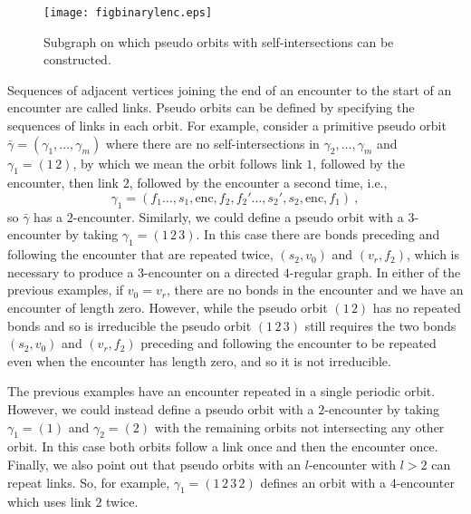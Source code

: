 \documentclass[doublecol]{epl2}
\newcommand{\bg}{\bar{\gamma}}
\newcommand{\enc}{\mathrm{enc}}
\begin{document}
\begin{figure}[htbp!]
	\texttt{[image: figbinarylenc.eps]}
	\caption{Subgraph on which pseudo orbits with self-intersections can be constructed.} 
	\label{fig:encounter}
\end{figure}

Sequences of adjacent vertices joining the end of an encounter to the start of an encounter are called links.  Pseudo orbits can be defined by specifying the sequences of links in each orbit.  For example, consider a primitive pseudo orbit $\bg=(\gamma_1,\dots, \gamma_m)$ where there are no self-intersections in $\gamma_2,\dots,\gamma_m$ and $\gamma_1 = (1 \, 2)$, by which we mean the orbit follows link $1$, followed by the encounter, then link $2$, followed by the encounter a second time, i.e.,
\begin{equation}
\gamma_1 = (f_1 \dots, s_1, \enc, f_2, f_2' \dots, s_2', s_2, \enc , f_1) \ ,
\label{eq:2enc}
\end{equation}
so $\bg$ has a $2$-encounter.  Similarly, we could define a pseudo orbit with a $3$-encounter by taking $\gamma_1=(1\,2\,3)$.  In this case there are bonds preceding and following the encounter that are repeated twice, $(s_2,v_0)$ and $(v_r,f_2)$, which is necessary to produce a $3$-encounter on a directed $4$-regular graph.  In either of the previous examples, if $v_0=v_r$, there are no bonds in the encounter and we have an encounter of length zero.  However, while the pseudo orbit $(1\,2)$ has no repeated bonds and so is irreducible the pseudo orbit $(1\,2\,3)$ still requires the two bonds $(s_2,v_0)$ and $(v_r,f_2)$ preceding and following the encounter to be repeated even when the encounter has length zero, and so it is not irreducible.  

The previous examples have an encounter repeated in a single periodic orbit.  However, we could instead define a pseudo orbit with a $2$-encounter by taking $\gamma_1=(1)$ and $\gamma_2=(2)$ with the remaining orbits not intersecting any other orbit.  In this case both orbits follow a link once and then the encounter once.
Finally, we also point out that pseudo orbits with an $l$-encounter with $l>2$ can repeat links. So, for example, $\gamma_1=(1\,2\,3\,2)$ defines an orbit with a $4$-encounter which uses link $2$ twice.
\end{document}
